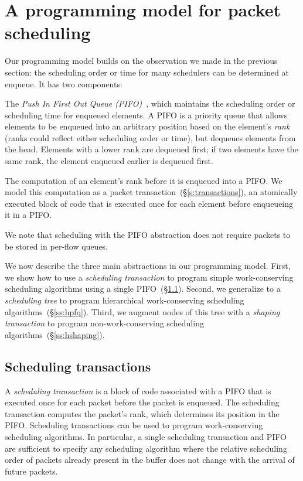 \section{A programming model for packet scheduling}
\label{s:pifo}

Our programming model builds on the observation we made in the previous
section: the scheduling order or time for many schedulers can be determined at
enqueue. It has two components:
\begin{CompactEnumerate}
\item The {\em Push In First Out Queue (PIFO)}~\cite{pifo}, which maintains the
scheduling order or scheduling time for enqueued elements. A PIFO is a priority
queue that allows elements to be enqueued into an arbitrary position based on
the element's {\em rank} (ranks could reflect either scheduling order or time),
but dequeues elements from the head. Elements with a lower rank are dequeued
first; if two elements have the same rank, the element enqueued earlier is
dequeued first.

\item The computation of an element's rank before it is enqueued into
  a PIFO. We model this computation as a packet
    transaction~(\S\ref{s:transactions}), an atomically executed block
  of code that is executed once for each element before enqueueing it
  in a PIFO.
\end{CompactEnumerate}

We note that scheduling with the PIFO abstraction does not require packets to
be stored in per-flow queues.

We now describe the three main abstractions in our programming model. First, we
show how to use a {\em scheduling transaction} to program simple
work-conserving scheduling algorithms using a single PIFO~(\S\ref{ss:wfq}).
Second, we generalize to a {\em scheduling tree} to program hierarchical
work-conserving scheduling algorithms~(\S\ref{ss:hpfq}). Third, we augment
nodes of this tree with a {\em shaping transaction} to program
non-work-conserving scheduling algorithms~(\S\ref{ss:hshaping}).

\subsection{Scheduling transactions}
\label{ss:wfq}

A {\em scheduling transaction} is a block of code associated with a PIFO that
is executed once for each packet before the packet is enqueued. The scheduling
transaction computes the packet's rank, which determines its position in the
PIFO. Scheduling transactions can be used to program work-conserving scheduling
algorithms. In particular, a single scheduling transaction and PIFO are
sufficient to specify any scheduling algorithm where the relative scheduling
order of packets already present in the buffer does not change with the arrival
of future packets.

